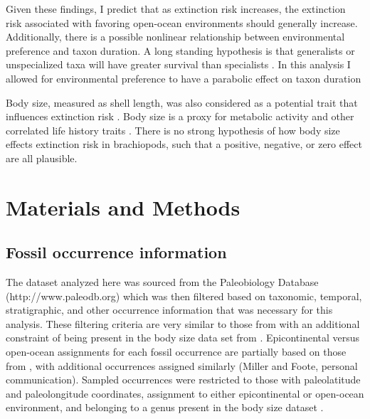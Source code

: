 \documentclass{article}
\begin{document}
Given these findings, I predict that as extinction risk increases, the extinction risk associated with favoring open-ocean environments should generally increase. Additionally, there is a possible nonlinear relationship between environmental preference and taxon duration. A long standing hypothesis is that generalists or unspecialized taxa will have greater survival than specialists \citep{Simpson1944,Liow2004a,Liow2007b,Nurnberg2013a,Nurnberg2015,Baumiller1993}. In this analysis I allowed for environmental preference to have a parabolic effect on taxon duration 

Body size, measured as shell length, was also considered as a potential trait that influences extinction risk \citep{Payne2014}. Body size is a proxy for metabolic activity and other correlated life history traits \citep{Payne2014}. There is no strong hypothesis of how body size effects extinction risk in brachiopods, such that a positive, negative, or zero effect are all plausible. 



\section{Materials and Methods}

\subsection{Fossil occurrence information}

The dataset analyzed here was sourced from the Paleobiology Database (http://www.paleodb.org) which was then filtered based on taxonomic, temporal, stratigraphic, and other occurrence information that was necessary for this analysis. These filtering criteria are very similar to those from \citet{Foote2013} with an additional constraint of being present in the body size data set from \citet{Payne2014}. Epicontinental versus open-ocean assignments for each fossil occurrence are partially based on those from \citet{Miller2009a}, with additional occurrences assigned similarly (Miller and Foote, personal communication). Sampled occurrences were restricted to those with paleolatitude and paleolongitude coordinates, assignment to either epicontinental or open-ocean environment, and belonging to a genus present in the body size dataset \citep{Payne2014}. 
\end{document}

